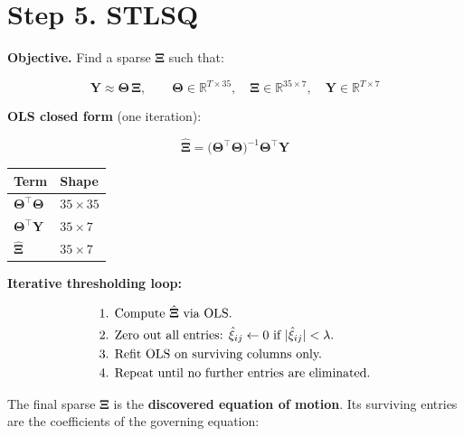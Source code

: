 \documentclass{article}
\begin{document}
\section*{Step 5. STLSQ}

\textbf{Objective.} Find a sparse $\boldsymbol{\Xi}$ such that:

\begin{equation}
    \mathbf{Y} \approx \boldsymbol{\Theta}\,\boldsymbol{\Xi},
    \qquad
    \boldsymbol{\Theta} \in \mathbb{R}^{T \times 35},\quad
    \boldsymbol{\Xi} \in \mathbb{R}^{35 \times 7},\quad
    \mathbf{Y} \in \mathbb{R}^{T \times 7}
\end{equation}

\textbf{OLS closed form} (one iteration):

\begin{equation}
    \hat{\boldsymbol{\Xi}}
    = \bigl(\boldsymbol{\Theta}^{\top}\boldsymbol{\Theta}\bigr)^{-1}
      \boldsymbol{\Theta}^{\top}\mathbf{Y}
\end{equation}

\begin{center}
\begin{tabular}{ll}
\toprule
Term & Shape \\
\midrule
$\boldsymbol{\Theta}^{\top}\boldsymbol{\Theta}$ & $35 \times 35$ \\
$\boldsymbol{\Theta}^{\top}\mathbf{Y}$          & $35 \times 7$  \\
$\hat{\boldsymbol{\Xi}}$                         & $35 \times 7$  \\
\bottomrule
\end{tabular}
\end{center}

\textbf{Iterative thresholding loop:}

\begin{align}
    &\text{1. Compute } \hat{\boldsymbol{\Xi}} \text{ via OLS.} \notag\\
    &\text{2. Zero out all entries: } \hat{\xi}_{ij} \leftarrow 0 \text{ if } |\hat{\xi}_{ij}| < \lambda. \notag\\
    &\text{3. Refit OLS on surviving columns only.} \notag\\
    &\text{4. Repeat until no further entries are eliminated.} \notag
\end{align}

The final sparse $\boldsymbol{\Xi}$ is the \textbf{discovered equation of motion}.
Its surviving entries are the coefficients of the governing equation:
\end{document}
